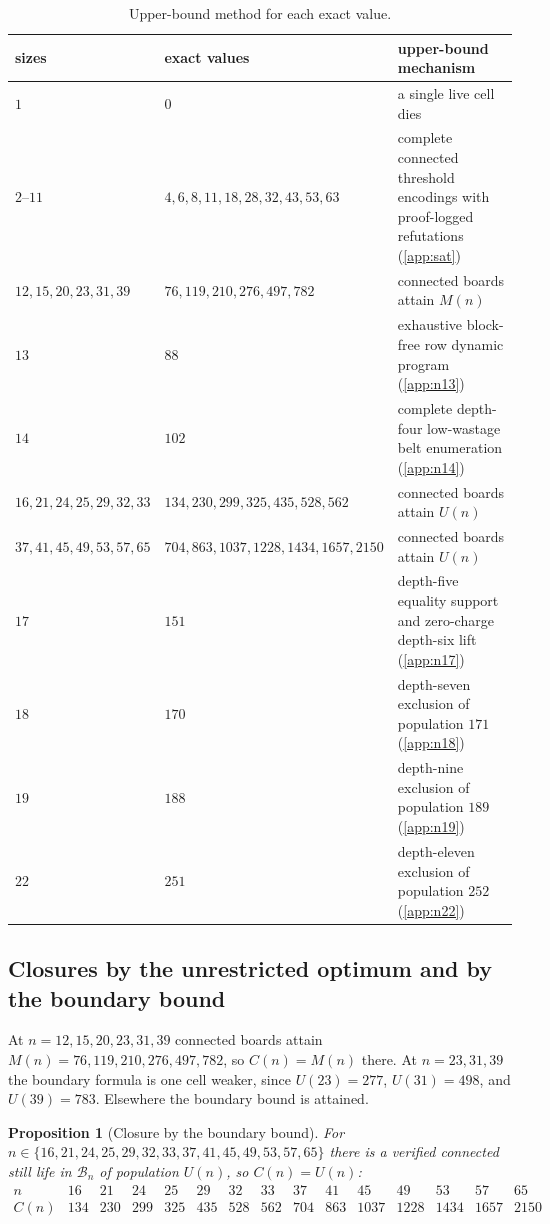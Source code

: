 \documentclass[10pt]{article}
\newtheorem{proposition}[theorem]{Proposition}
\theoremstyle{remark}
\newcommand{\B}{\mathcal B}
\begin{document}
\begin{table}[!htbp]
\centering
\caption{Upper-bound method for each exact value.}
\label{tab:exact-methods}
\small
\begin{tabularx}{\textwidth}{@{}>{\raggedright\arraybackslash}p{} >{\raggedright\arraybackslash}p{} X@{}}
\toprule
sizes & exact values & upper-bound mechanism \\
\midrule
$1$ & $0$ & a single live cell dies \\
$2$--$11$ & $4,6,8,11,18,28,32,43,53,63$ & complete connected threshold encodings with proof-logged refutations (\cref{app:sat}) \\
$12,15,20,23,31,39$ & $76,119,210,276,497,782$ & connected boards attain $M(n)$ \\
$13$ & $88$ & exhaustive block-free row dynamic program (\cref{app:n13}) \\
$14$ & $102$ & complete depth-four low-wastage belt enumeration (\cref{app:n14}) \\
$16,21,24,25,29,32,33$ & $134,230,299,325,435,528,562$ & connected boards attain $U(n)$ \\
$37,41,45,49,53,57,65$ & $704,863,1037,1228,1434,1657,2150$ & connected boards attain $U(n)$ \\
$17$ & $151$ & depth-five equality support and zero-charge depth-six lift (\cref{app:n17}) \\
$18$ & $170$ & depth-seven exclusion of population $171$ (\cref{app:n18}) \\
$19$ & $188$ & depth-nine exclusion of population $189$ (\cref{app:n19}) \\
$22$ & $251$ & depth-eleven exclusion of population $252$ (\cref{app:n22}) \\
\bottomrule
\end{tabularx}
\end{table}

\subsection{Closures by the unrestricted optimum and by the boundary bound}
\label{sec:closures-U}

At $n=12,15,20,23,31,39$ connected boards attain
$M(n)=76,119,210,276,497,782$, so $C(n)=M(n)$ there.  At $n=23,31,39$ the
boundary formula is one cell weaker, since $U(23)=277$, $U(31)=498$, and
$U(39)=783$.  Elsewhere the boundary bound is attained.

\begin{proposition}[Closure by the boundary bound]\label{prop:closure-U}
For $n\in\{16,21,24,25,29,32,33,37,41,45,49,53,57,65\}$ there is a verified
connected still life in $\B_n$ of population $U(n)$, so $C(n)=U(n)$:
\[
\begin{array}{c|cccccccccccccc}
n&16&21&24&25&29&32&33&37&41&45&49&53&57&65\\
\hline
C(n)&134&230&299&325&435&528&562&704&863&1037&1228&1434&1657&2150
\end{array}
\]
\end{proposition}
\end{document}
